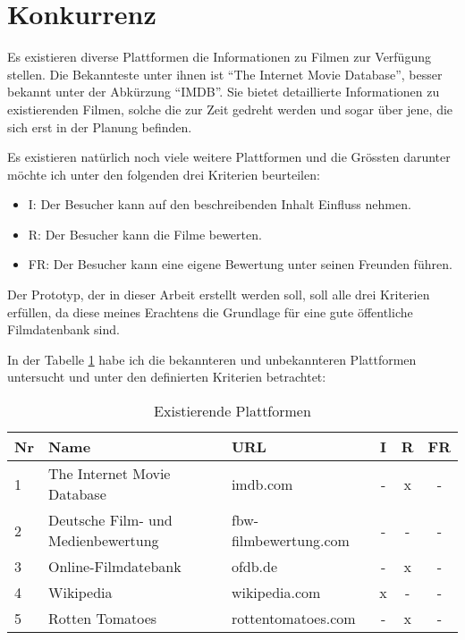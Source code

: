 \section{Konkurrenz}
Es existieren diverse Plattformen die Informationen zu Filmen zur Verfügung stellen.
Die Bekannteste \cite{movie_informations} unter ihnen ist ``The Internet Movie Database'',
besser bekannt unter der Abkürzung ``IMDB''. Sie bietet detaillierte Informationen
zu existierenden Filmen, solche die zur Zeit gedreht werden und sogar über jene, die
sich erst in der Planung befinden.

Es existieren natürlich noch viele weitere Plattformen und die Grössten darunter
möchte ich unter den folgenden drei Kriterien beurteilen:

\begin{itemize}
    \item I: Der Besucher kann auf den beschreibenden Inhalt Einfluss nehmen.
    \item R: Der Besucher kann die Filme bewerten. 
    \item FR: Der Besucher kann eine eigene Bewertung unter seinen Freunden führen.
\end{itemize}

Der Prototyp, der in dieser Arbeit erstellt werden soll, soll alle drei Kriterien
erfüllen, da diese meines Erachtens die Grundlage für eine gute öffentliche Filmdatenbank 
sind.

In der Tabelle \ref{tab:plattformen} habe ich die bekannteren und unbekannteren 
Plattformen untersucht und unter den definierten Kriterien betrachtet:

\begin{table}[h]
\begin{center}
    \begin{tabular}{lllccc}
        \toprule Nr & Name & URL & I & R & FR \\
        \midrule 1 & The Internet Movie Database & imdb.com & - & x & - \\
        \midrule 2 & Deutsche Film- und Medienbewertung & fbw-filmbewertung.com & - & - & - \\
        \midrule 3 & Online-Filmdatebank & ofdb.de & - & x & - \\
        \midrule 4 & Wikipedia & wikipedia.com & x & - & - \\
        \midrule 5 & Rotten Tomatoes & rottentomatoes.com & - & x & - \\
        \bottomrule
    \end{tabular}
    \caption{Existierende Plattformen}
    \label{tab:plattformen}
\end{center}
\end{table}


